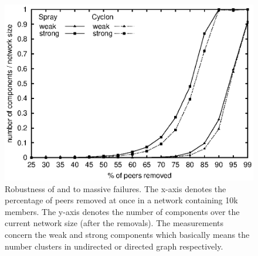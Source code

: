\begin{figure}
  \centering
  \includegraphics[width=.8\textwidth]{img/spray/resilience.eps}
  \caption{\label{fig:spray:resilience}Robustness of \CYCLON and \SPRAY to
    massive failures. The x-axis denotes the percentage of peers removed at once
    in a network containing 10k members. The y-axis denotes the number of
    components over the current network size (after the removals). The
    measurements concern the weak and strong components which basically means
    the number clusters in undirected or directed graph respectively.}
\end{figure}

